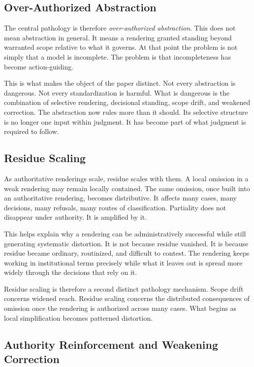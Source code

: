 \documentclass[11pt]{article}
\renewcommand{\emph}[1]{\textit{#1}}
\begin{document}
\subsection{Over-Authorized Abstraction}

The central pathology is therefore \emph{over-authorized abstraction}. This does not mean abstraction in general. It means a rendering granted standing beyond warranted scope relative to what it governs. At that point the problem is not simply that a model is incomplete. The problem is that incompleteness has become action-guiding.

This is what makes the object of the paper distinct. Not every abstraction is dangerous. Not every standardization is harmful. What is dangerous is the combination of selective rendering, decisional standing, scope drift, and weakened correction. The abstraction now rules more than it should. Its selective structure is no longer one input within judgment. It has become part of what judgment is required to follow.

\subsection{Residue Scaling}

As authoritative renderings scale, residue scales with them. A local omission in a weak rendering may remain locally contained. The same omission, once built into an authoritative rendering, becomes distributive. It affects many cases, many decisions, many refusals, many routes of classification. Partiality does not disappear under authority. It is amplified by it.\cite{Swanson2026ConstrainedDescribability,BowkerStar1999SortingThingsOut,Eubanks2018AutomatingInequality}

This helps explain why a rendering can be administratively successful while still generating systematic distortion. It is not because residue vanished. It is because residue became ordinary, routinized, and difficult to contest. The rendering keeps working in institutional terms precisely while what it leaves out is spread more widely through the decisions that rely on it.

Residue scaling is therefore a second distinct pathology mechanism. Scope drift concerns widened reach. Residue scaling concerns the distributed consequences of omission once the rendering is authorized across many cases. What begins as local simplification becomes patterned distortion.

\subsection{Authority Reinforcement and Weakening Correction}
\end{document}
